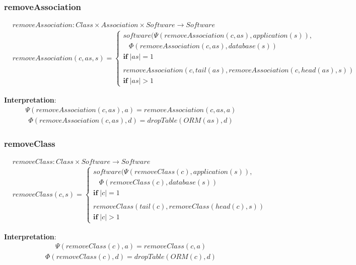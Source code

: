 \documentclass[10pt]{article}
\begin{document}
\subsubsection{removeAssociation}
\begin{align}
& removeAssociation: Class \times Association \times Software \rightarrow Software \nonumber \\
& removeAssociation(c, as, s) = \begin{cases}
   software(\Psi( removeAssociation(c, as), application(s)), \\ 
    \;\;\; \Phi(removeAssociation(c, as), database(s)) \\
     \mathbf{if} \; |as| = 1 \\\\
   removeAssociation(c, tail(as), removeAssociation(c, head(as), s)) \\
     \mathbf{if} \; |as| > 1 
 \end{cases}
\end{align}

\noindent \textbf{Interpretation}:
\begin{align}
\Psi(removeAssociation(c, as), a) = removeAssociation(c, as, a)
\end{align}
\begin{align}
\Phi(removeAssociation(c, as), d) = dropTable(ORM(as), d)
\end{align}

\subsubsection{removeClass}
\begin{align}
& removeClass: Class \times Software \rightarrow Software \nonumber \\
& removeClass(c, s) = \begin{cases}
 software(\Psi(removeClass(c), application(s)), \\
\;\;\; \Phi(removeClass(c), database(s)) \\
\mathbf{if} \; |c| = 1 \\\\
 removeClass(tail(c), removeClass(head(c), s)) \\
\mathbf{if} \; |c| > 1
 \end{cases}
\end{align}

\noindent \textbf{Interpretation}:
\begin{align}
\Psi(removeClass(c), a) = removeClass(c, a)
\end{align}
\begin{align}
\Phi(removeClass(c), d) = dropTable(ORM(c), d)
\end{align}
\end{document}
